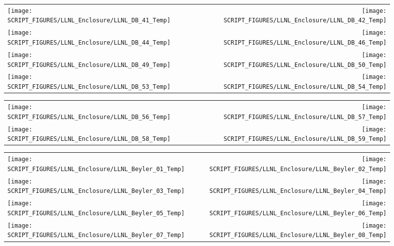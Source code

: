 \begin{figure}[!ht]
\begin{tabular*}{\textwidth}{l@{\extracolsep{\fill}}r}
\texttt{[image: SCRIPT\_FIGURES/LLNL\_Enclosure/LLNL\_DB\_41\_Temp]} &
\texttt{[image: SCRIPT\_FIGURES/LLNL\_Enclosure/LLNL\_DB\_42\_Temp]} \\
\texttt{[image: SCRIPT\_FIGURES/LLNL\_Enclosure/LLNL\_DB\_44\_Temp]} &
\texttt{[image: SCRIPT\_FIGURES/LLNL\_Enclosure/LLNL\_DB\_46\_Temp]} \\
\texttt{[image: SCRIPT\_FIGURES/LLNL\_Enclosure/LLNL\_DB\_49\_Temp]} &
\texttt{[image: SCRIPT\_FIGURES/LLNL\_Enclosure/LLNL\_DB\_50\_Temp]} \\
\texttt{[image: SCRIPT\_FIGURES/LLNL\_Enclosure/LLNL\_DB\_53\_Temp]} &
\texttt{[image: SCRIPT\_FIGURES/LLNL\_Enclosure/LLNL\_DB\_54\_Temp]}
\end{tabular*}
\end{figure}

\begin{figure}[!ht]
\begin{tabular*}{\textwidth}{l@{\extracolsep{\fill}}r}
\texttt{[image: SCRIPT\_FIGURES/LLNL\_Enclosure/LLNL\_DB\_56\_Temp]} &
\texttt{[image: SCRIPT\_FIGURES/LLNL\_Enclosure/LLNL\_DB\_57\_Temp]} \\
\texttt{[image: SCRIPT\_FIGURES/LLNL\_Enclosure/LLNL\_DB\_58\_Temp]} &
\texttt{[image: SCRIPT\_FIGURES/LLNL\_Enclosure/LLNL\_DB\_59\_Temp]}
\end{tabular*}
\end{figure}

\begin{figure}[!ht]
\begin{tabular*}{\textwidth}{l@{\extracolsep{\fill}}r}
\texttt{[image: SCRIPT\_FIGURES/LLNL\_Enclosure/LLNL\_Beyler\_01\_Temp]} &
\texttt{[image: SCRIPT\_FIGURES/LLNL\_Enclosure/LLNL\_Beyler\_02\_Temp]} \\
\texttt{[image: SCRIPT\_FIGURES/LLNL\_Enclosure/LLNL\_Beyler\_03\_Temp]} &
\texttt{[image: SCRIPT\_FIGURES/LLNL\_Enclosure/LLNL\_Beyler\_04\_Temp]} \\
\texttt{[image: SCRIPT\_FIGURES/LLNL\_Enclosure/LLNL\_Beyler\_05\_Temp]} &
\texttt{[image: SCRIPT\_FIGURES/LLNL\_Enclosure/LLNL\_Beyler\_06\_Temp]} \\
\texttt{[image: SCRIPT\_FIGURES/LLNL\_Enclosure/LLNL\_Beyler\_07\_Temp]} &
\texttt{[image: SCRIPT\_FIGURES/LLNL\_Enclosure/LLNL\_Beyler\_08\_Temp]}
\end{tabular*}
\end{figure}

